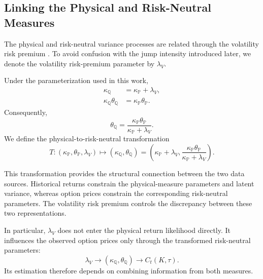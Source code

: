 \documentclass[sigconf,anonymous,review]{acmart}
\begin{document}
\subsection{Linking the Physical and Risk-Neutral Measures}
\label{sec:pq_transformation}

The physical and risk-neutral variance processes are related through the volatility risk premium \cite{aihara2006filtering,forbes2007inference,hurn2015estimating}. To avoid confusion with the jump intensity introduced later, we denote the volatility risk-premium parameter by \(\lambda_V\).

Under the parameterization used in this work,
%
\begin{align}
\kappa_{\mathbb{Q}}
&=
\kappa_{\mathbb{P}}+\lambda_V,
\label{eq:kappa_pq}
\\
\kappa_{\mathbb{Q}}\theta_{\mathbb{Q}}
&=
\kappa_{\mathbb{P}}\theta_{\mathbb{P}}.
\label{eq:mean_pq}
\end{align}
%
Consequently,
%
\begin{equation}
\theta_{\mathbb{Q}}
=
\frac{
\kappa_{\mathbb{P}}\theta_{\mathbb{P}}
}{
\kappa_{\mathbb{P}}+\lambda_V
}.
\label{eq:theta_pq}
\end{equation}
%
We define the physical-to-risk-neutral transformation
%
\begin{equation}
T:
\left(
\kappa_{\mathbb{P}},
\theta_{\mathbb{P}},
\lambda_V
\right)
\mapsto
\left(
\kappa_{\mathbb{Q}},
\theta_{\mathbb{Q}}
\right)
=
\left(
\kappa_{\mathbb{P}}+\lambda_V,
\frac{
\kappa_{\mathbb{P}}\theta_{\mathbb{P}}
}{
\kappa_{\mathbb{P}}+\lambda_V
}
\right).
\label{eq:pq_map}
\end{equation}

This transformation provides the structural connection between the two data sources. Historical returns constrain the physical-measure parameters and latent variance, whereas option prices constrain the corresponding risk-neutral parameters. The volatility risk premium controls the discrepancy between these two representations.

In particular, \(\lambda_V\) does not enter the physical return likelihood directly. It influences the observed option prices only through the transformed risk-neutral parameters:
%
\begin{equation}
\lambda_V
\longrightarrow
\left(
\kappa_{\mathbb{Q}},
\theta_{\mathbb{Q}}
\right)
\longrightarrow
C_t(K,\tau).
\end{equation}
%
Its estimation therefore depends on combining information from both measures.
\end{document}
